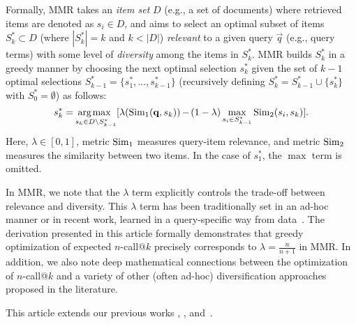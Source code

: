 Formally, MMR takes an \emph{item set} $D$ (e.g., a set of documents) where retrieved items
are denoted as $s_i \in D$, and aims to select an optimal subset of
items $S_k^* \subset D$ (where $|S_k^*| = k$ and $k < |D|$)
\emph{relevant} to a given query $\vec{q}$ (e.g., query terms) with
some level of \emph{diversity} among the items in $S_k^*$.  MMR
builds $S_k^*$ in a greedy manner by choosing the next optimal
selection $s_k^*$ given the set of $k-1$ optimal selections
$S_{k-1}^* = \{ s_1^*, \ldots, s_{k-1}^* \}$ (recursively defining
$S_k^* = S_{k-1}^* \cup \{ s_k^* \}$ with $S_0^* = \emptyset$)
as follows:
\begin{equation}\label{eq:MMR}
 s_k^* = \hspace{-.3mm} \argmax_{s_k \in D \setminus S_{k-1}^*} [ \lambda(\Sim_{1}(\vec{q},s_k))\hspace{-.3mm}-\hspace{-.3mm}(1-\lambda)\max_{s_i \in S_{k-1}^*} \Sim_{2}(s_i,s_k) ].
\end{equation}
Here, 
$\lambda \in [0, 1]$, metric $\mathrm{Sim}_{1}$ measures
query-item relevance, and metric $\mathrm{Sim}_{2}$ measures the similarity
between two items. In the case of $s_1^*$, the $\max$ term is omitted.

In MMR, we note that the $\lambda$ term explicitly controls the
trade-off between relevance and diversity. This $\lambda$ term has
been traditionally set in an ad-hoc manner or in recent work, learned
in a query-specific way from data~\cite{santos2010selectively}.  The
derivation presented in this article formally demonstrates that greedy
optimization of expected $n$-call@$k$ precisely corresponds to $\lambda
= \frac{n}{n+1}$ in MMR.  In addition, we also note deep mathematical
connections between the optimization of $n$-call@$k$ and a variety of
other (often ad-hoc) diversification approaches proposed in the
literature.

This article extends our previous works \cite{plmmr}, \cite{sanner11},
and~\cite{LimKarWai:SIGIR2012}.


